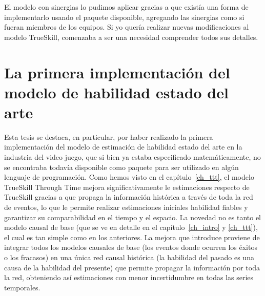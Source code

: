 \documentclass[a4paper,11pt]{book}
\theoremstyle{definition}
\begin{document}

El modelo con sinergias lo pudimos aplicar gracias a que exist\'ia una forma de implementarlo usando el paquete disponible, agregando las sinergias como si fueran miembros de los equipos.
%
Si yo quer\'ia realizar nuevas modificaciones al modelo TrueSkill, comenzaba a ser una necesidad comprender todos sus detalles.

\section{La primera implementaci\'on del modelo de habilidad estado del arte}

Esta tesis se destaca, en particular, por haber realizado la primera implementaci\'on del modelo de estimaci\'on de habilidad estado del arte en la industria del video juego, que si bien ya estaba especificado matem\'aticamente, no se encontraba todav\'ia disponible como paquete para ser utilizado en alg\'un lenguaje de programaci\'on.
%
Como hemos visto en el cap\'itulo~\ref{ch_ttt}, el modelo TrueSkill Through Time mejora significativamente le estimaciones respecto de TrueSkill gracias a que propaga la informaci\'on hist\'orica a trav\'es de toda la red de eventos, lo que le permite realizar estimaciones iniciales habilidad fiables y garantizar su comparabilidad en el tiempo y el espacio.
%
La novedad no es tanto el modelo causal de base (que se ve en detalle en el cap\'itulo~\ref{ch_intro} y \ref{ch_ttt}), el cual es tan simple como en los anteriores.
%
La mejora que introduce proviene de integrar todos los modelos causales de base (los eventos donde ocurren los \'exitos o los fracasos) en una \'unica red causal hist\'orica (la habilidad del pasado es una causa de la habilidad del presente) que permite propagar la informaci\'on por toda la red, obteniendo as\'i estimaciones con menor incertidumbre en todas las series temporales.

%
\end{document}
